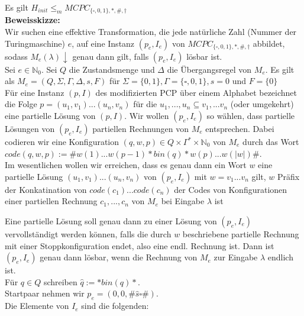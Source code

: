 
\begin{lemma}{}
    Es gilt $H_{init} \leq_m MCPC_{\{\square, 0,1\},*,\#,\dagger}$ \\

    \textbf{Beweisskizze:} \\
    Wir suchen eine effektive Transformation, die jede natürliche Zahl (Nummer der Turingmaschine) $e$, auf eine 
    Instanz $(p_e,I_e)$ von $MCPC_{\{\square, 0,1\},*,\#,\dagger}$ abbildet, sodass $M_e(\lambda)\downarrow$ genau dann gilt,
    falls $(p_e,I_e)$ lösbar ist. \\

    Sei $e \in \mathbb{N}_0$. Sei $Q$ die Zustandsmenge und $\Delta$ die Übergangsregel von $M_e$.
    Es gilt als $M_e=(Q,\Sigma, \Gamma, \Delta, s, F)$ für $\Sigma = \{0,1\}, \Gamma = \{\square,0,1\}, s=0$ und $F=\{0\}$ \\

    
    Für eine Instanz $(p,I)$ des modifizierten PCP über einem Alphabet bezeichnet die Folge 
    $p = (u_1,v_1)...(u_n,v_n)$ für die $u_1,...,u_n \subseteq v_1,...v_n$ (oder umgekehrt) eine partielle Lösung von
    $(p,I)$. Wir wollen $(p_e,I_e)$ so wählen, dass partielle Lösungen von $(p_e,I_e)$ partiellen Rechnungen von $M_e$ entsprechen. 
    Dabei codieren wir eine Konfiguration $(q,w,p) \in Q \times \Gamma^* \times \mathbb{N}_0$ von $M_e$ durch das Wort
    $code(q,w,p) := \#w(1)...w(p-1)*bin(q)*w(p)...w(\vert w \vert)\#$. \\

    Im wesentlichen wollen wir erreichen, dass es genau dann ein Wort $w$ eine partielle Lösung $(u_1,v_1)...(u_n,v_n)$
    von $(p_e,I_e)$ mit $w = v_1...v_n$ gilt, $w$ Präfix der Konkatination von $code(c_1)...code(c_n)$ der Codes von Konfigurationen
    einer partiellen Rechnung $c_1,...,c_n$ von $M_e$ bei Eingabe $\lambda$ ist

    Eine partielle Lösung soll genau dann zu einer Lösung von $(p_e,I_e)$ vervollständigt werden können, falls die durch $w$ beschriebene 
    partielle Rechnung mit einer Stoppkonfiguration endet, also eine endl. Rechnung ist. Dann ist $(p_e, I_e)$ genau dann lösbar, wenn 
    die Rechnung von $M_e$ zur Eingabe $\lambda$ endlich ist. \\

    Für $q \in Q$ schreiben $\hat{q} := * bin(q) *.$ \\
    Startpaar nehmen wir $p_e = (0,0,\# \hat{s} \square \#)$. \\
    Die Elemente von $I_e$ sind die folgenden:
    

\end{lemma}
